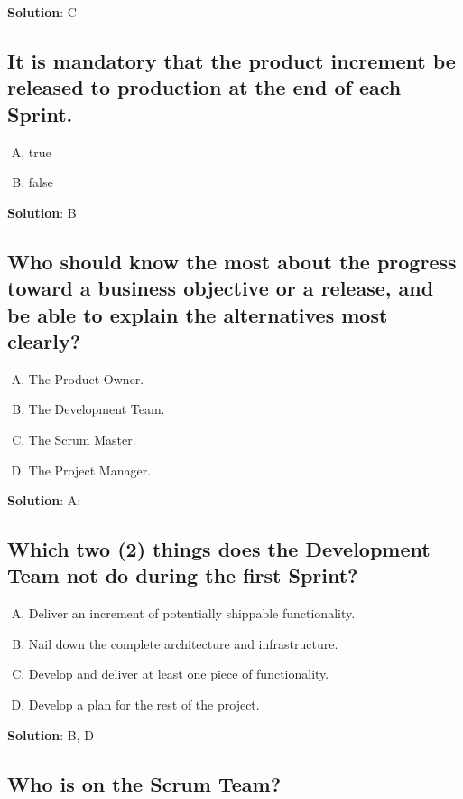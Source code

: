 \textbf{Solution}: C


\subsection{It is mandatory that the product increment be released to production at the end of each Sprint.}
\begin{enumerate}[A)]
  \item true
  \item false
\end{enumerate}


\textbf{Solution}: B


\subsection{Who should know the most about the progress toward a business objective or a
  release, and be able to explain the alternatives most clearly?}
\begin{enumerate}[A)]
  \item The Product Owner.
  \item The Development Team.
  \item The Scrum Master.
  \item The Project Manager.
\end{enumerate}


\textbf{Solution}: A:


\subsection{Which two (2) things does the Development Team not do during the first Sprint?}
\begin{enumerate}[A)]
  \item Deliver an increment of potentially shippable functionality.
  \item Nail down the complete architecture and infrastructure.
  \item Develop and deliver at least one piece of functionality.
  \item Develop a plan for the rest of the project.
\end{enumerate}


\textbf{Solution}: B, D


\subsection{Who is on the Scrum Team?}

